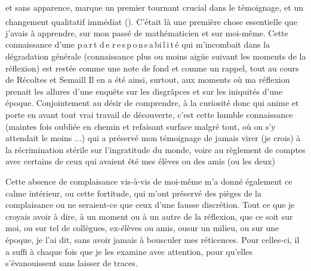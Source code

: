 et sans apparence, marque un premier tournant crucial dans le témoignage, et un changement qualitatif immédiat (\textsuperscript{}). C'était là une première chose essentielle que j'avais à apprendre, sur mon passé de mathématicien et sur moi-même. Cette connaissance d'une \mbox{p\,a\,r\,t} \mbox{d\,e} \mbox{r\,e\,s\,p\,o\,n\,s\,a\,bi\,l\,i\,t\,é} qui m'incombait dans la dégradation générale (connaissance plus ou moins aigüe suivant les moments de la réflexion) est restée comme une note de fond et comme un rappel, tout au cours de Récoltes et Semaill Il en a été ainsi, surtout, aux moments où ma réflexion prenait les allures d'une enquête sur les disgrâpces et sur les iniquités d'une époque. Conjointement au désir de comprendre, à la curiosité donc qui anime et porte en avant tout vrai travail de découverte, c'est cette humble connaissance (maintes fois oubliée en chemin et refaisant surface malgré tout,  où on s'y attendait le moins ...) qui a préservé mon témoignage de jamais virer (je crois) à la récrimination stérile sur l'ingratitude du monde, voire au règlement de comptes avec certains de ceux qui avaient été mes élèves ou des amis (ou les deux)

Cette absence de complaisance vis-à-vis de moi-même m'a donné également ce calme intérieur, ou cette fortitude, qui m'ont préservé des pièges de la complaisance\handwritten{,} \deleted{\unsure{(}}ou ne seraient-ce que ceux d'une fausse discrétion\deleted{\unsure{)}}. Tout ce que je croyais avoir à dire, à un moment ou à un autre de la réflexion, que ce soit sur moi, ou sur tel de  collègues, ex-élèves ou amis, ou\unsure{\_}sur un milieu, ou sur une époque, je l'ai dit, sans avoir jamais à bousculer mes réticences. Pour celles-ci, il a suffi à chaque fois que je les examine avec attention, pour qu'elles s'évanouissent sans laisser de traces.
